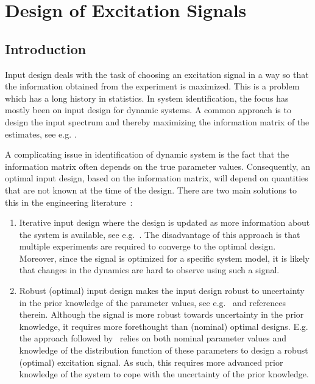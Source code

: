 \chapter{Design of Excitation Signals}
\label{sec:excitation}
\def\thisDir{ch02-qlogms}
\glsresetall{}

\section{Introduction}
\label{sec:excitation:intro}
Input design deals with the task of choosing an excitation signal in a way so that the information obtained from the experiment is maximized.  
This is a problem which has a long history in statistics. 
In system identification, the focus has mostly been on input design for dynamic systems.
A common approach is to design the input spectrum and thereby maximizing the information matrix of the estimates, see e.g. \citep{Fedorov1972,Goodwin1977}.

A complicating issue in identification of dynamic system is the fact that the information matrix often depends on the true parameter values. 
Consequently, an optimal input design, based on the information matrix, will depend on quantities that are not known at the time of the design.
There are two main solutions to this in the engineering literature~\citep{Goodwin2006GBO}:
\begin{enumerate}
\item Iterative input design where the design is updated as more information about the system is available, see e.g.~\citep{Hjalmarsson2005,Gevers2005}.
The disadvantage of this approach is that multiple experiments are required to converge to the optimal design.
Moreover, since the signal is optimized for a specific system model, it is likely that changes in the dynamics are hard to observe using such a signal.

\item Robust (optimal) input design makes the input design robust to uncertainty in the prior knowledge of the parameter values, see e.g.~\citep{Rojas2007,Goodwin2006GBO,Rojas2012} and references therein. 
Although the signal is more robust towards uncertainty in the prior knowledge, it requires more forethought than (nominal) optimal designs.
E.g. the approach followed by~\citet{Rojas2007} relies on both nominal parameter values and  knowledge of the distribution function of these parameters to design a robust (optimal) excitation signal.
As such, this requires more advanced prior knowledge of the system to cope with the uncertainty of the prior knowledge.
\end{enumerate}

